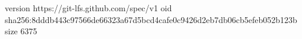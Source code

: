 version https://git-lfs.github.com/spec/v1
oid sha256:8dddb443c97566de66323a67d5bcd4cafe0c9426d2eb7db06cb5efeb052b123b
size 6375
